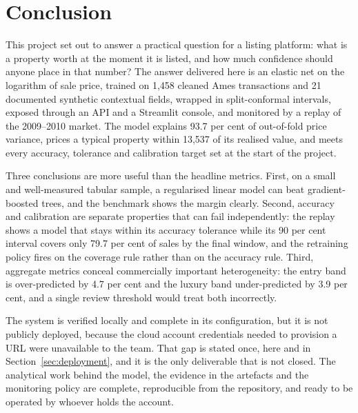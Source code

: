 \section{Conclusion}
\label{sec:conclusion}

This project set out to answer a practical question for a listing platform: what is a
property worth at the moment it is listed, and how much confidence should anyone place
in that number? The answer delivered here is an elastic net on the logarithm of sale
price, trained on 1,458 cleaned Ames transactions and 21 documented synthetic
contextual fields, wrapped in split-conformal intervals, exposed through an API and a
Streamlit console, and monitored by a replay of the 2009--2010 market. The model
explains 93.7 per cent of out-of-fold price variance, prices a typical property within
13,537 \USD{} of its realised value, and meets every accuracy, tolerance and
calibration target set at the start of the project.

Three conclusions are more useful than the headline metrics. First, on a small and
well-measured tabular sample, a regularised linear model can beat gradient-boosted
trees, and the benchmark shows the margin clearly. Second, accuracy and calibration
are separate properties that can fail independently: the replay shows a model that
stays within its accuracy tolerance while its 90 per cent interval covers only 79.7
per cent of sales by the final window, and the retraining policy fires on the coverage
rule rather than on the accuracy rule. Third, aggregate metrics conceal commercially
important heterogeneity: the entry band is over-predicted by 4.7 per cent and the
luxury band under-predicted by 3.9 per cent, and a single review threshold would treat
both incorrectly.

The system is verified locally and complete in its configuration, but it is not
publicly deployed, because the cloud account credentials needed to provision a URL
were unavailable to the team. That gap is stated once, here and in
Section~\ref{sec:deployment}, and it is the only deliverable that is not closed. The
analytical work behind the model, the evidence in the artefacts and the monitoring
policy are complete, reproducible from the repository, and ready to be operated by
whoever holds the account.
